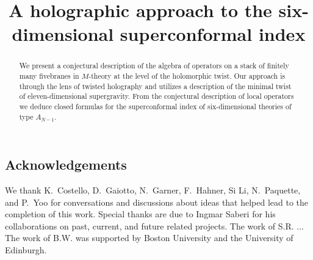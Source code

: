 \documentclass[11pt]{amsart}
\begin{document}
\title{A holographic approach to the six-dimensional superconformal index}
\maketitle

\begin{abstract}
We present a conjectural description of the algebra of operators on a stack of finitely many fivebranes in $M$-theory at the level of the holomorphic twist.
Our approach is through the lens of twisted holography and utilizes a description of the minimal twist of eleven-dimensional supergravity. 
From the conjectural description of local operators we deduce closed formulas for the superconformal index of six-dimensional theories of type $A_{N-1}$.
\end{abstract}

\setcounter{tocdepth}{1}
\tableofcontents



\subsection*{Acknowledgements}
We thank K.~Costello, D.~Gaiotto, N.~Garner, F.~Hahner, Si Li, N.~Paquette, and P.~Yoo for conversations and discussions about ideas that helped lead to the completion of this work. 
Special thanks are due to Ingmar Saberi for his collaborations on past, current, and future related projects.
The work of S.R. ...
The work of B.W. was supported by Boston University and the University of Edinburgh. 








 




\printbibliography
\end{document}
